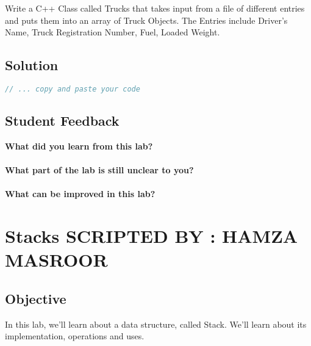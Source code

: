 \documentclass[11pt,fleqn]{book} %
\begin{document}
\begin{problem} Write a C++ Class called Trucks that takes input from a file of different entries and puts them into an array of Truck Objects. The Entries include Driver's Name, Truck Registration Number, Fuel, Loaded Weight.
\end{problem}

\newpage
\section{Solution}
\begin{lstlisting}[language=C++]
  // ... copy and paste your code
\end{lstlisting}

\newpage
\section{Student Feedback}
\textbf{What did you learn from this lab?}\\
\noindent\fbox{\parbox{\textwidth}{
  }
}\\
\textbf{What part of the lab is still unclear to you?}\\
\noindent\fbox{\parbox{\textwidth}{
  }
}\\
\textbf{What can be improved in this lab?}\\ 
\noindent\fbox{\parbox{\textwidth}{
  }
}

\newpage
{} %
\chapter{Stacks \hspace{76mm} {\textsc{\small SCRIPTED BY : HAMZA MASROOR}}}
\section{Objective}
In this lab, we'll learn about a data structure, called Stack. We'll learn about its implementation, operations and uses.
\end{document}
